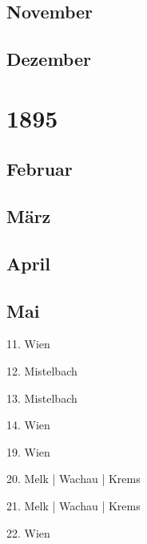 \documentclass[twoside=false,titlepage=false,open=any, parskip=never, fontsize=10pt, headings=small, chapterprefix=false, appendixprefix=false, DIV=15]{scrbook}
\begin{document}
\begin{multicols}{3}
            \section*{November}
            \section*{Dezember}
            \chapter*{1895}
            \section*{Februar}
            \section*{März}
            \section*{April}
            \section*{Mai}
            11. Wien\par
            12. Mistelbach\par
            13. Mistelbach\par
            14. Wien\par
            19. Wien\par
            20. Melk | Wachau | Krems\par
            21. Melk | Wachau | Krems\par
            22. Wien\par

\end{multicols}
\end{document}
